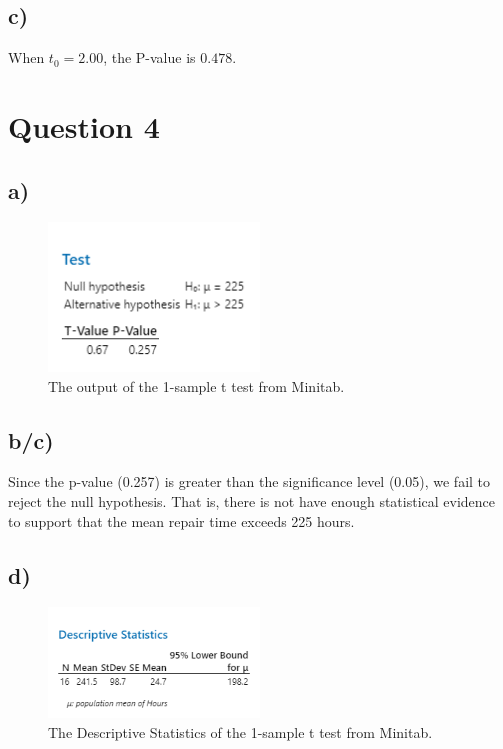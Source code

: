 \documentclass{article}
\begin{document}
\subsection*{c)}
When $t_0 = 2.00$, the P-value is $0.478$.

\section*{Question 4}

\subsection*{a)}

\begin{figure}[h]
    \centering
    \includegraphics[width=0.5\textwidth]{./hw_1/images/4_b.png}
    \caption{The output of the 1-sample t test from Minitab.}
    \label{fig:4_a}
  \end{figure}

\subsection*{b/c)}
Since the p-value (0.257)
is greater than the significance level (0.05),
we fail to reject the null hypothesis. That is,
there is not have enough statistical evidence to support that the mean repair
time exceeds 225 hours.
\subsection*{d)}
\begin{figure}[h]
    \centering
    \includegraphics[width=0.5\textwidth]{./hw_1/images/4_a.png}
    \caption{The Descriptive Statistics of the 1-sample t test from Minitab.}
    \label{fig:4_b}
  \end{figure}
\end{document}
